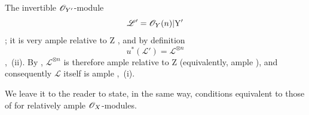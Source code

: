 \begin{corollary}[18.12.17]
The invertible $\mathscr{O}_{Y'}$-module
\[
  \mathscr{L}'=\mathscr{O}_Y(n)|\mathrm{Y}'
\]
; it is very ample relative to $\mathrm{Z}$ , and by definition
\[
  u^*(\mathscr{L}')=\mathscr{L}^{\otimes n}
\]
,~(ii). By , $\mathscr{L}^{\otimes n}$ is therefore ample relative to $\mathrm{Z}$ (equivalently, ample ), and consequently $\mathscr{L}$ itself is ample ,~(i).

We leave it to the reader to state, in the same way, conditions equivalent to those of  for relatively ample $\mathscr{O}_X$-modules.
\end{corollary}
